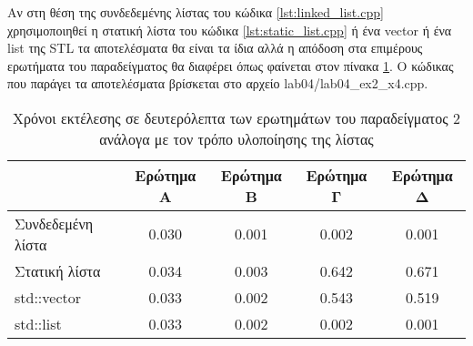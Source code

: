 



Αν στη θέση της συνδεδεμένης λίστας του κώδικα \ref{lst:linked_list.cpp} χρησιμοποιηθεί η στατική λίστα του κώδικα \ref{lst:static_list.cpp} ή ένα vector ή ένα list της STL τα αποτελέσματα θα είναι τα ίδια αλλά η απόδοση στα επιμέρους ερωτήματα του παραδείγματος θα διαφέρει όπως φαίνεται στον πίνακα \ref{tbl:lists}. Ο κώδικας που παράγει τα αποτελέσματα βρίσκεται στο αρχείο lab04/lab04\_ex2\_x4.cpp.

\begin{table}[!htb]
\centering
\begin{tabular}{|l|c|c|c|c|}
\hline
            & Ερώτημα A     & Ερώτημα B     & Ερώτημα Γ     & Ερώτημα Δ     \\ \hline
Συνδεδεμένη  λίστα & 0.030 & 0.001 & 0.002 & 0.001 \\ \hline
Στατική λίστα  & 0.034 & 0.003 & 0.642 & 0.671 \\ \hline
std::vector     & 0.033 & 0.002 & 0.543 & 0.519 \\ \hline
std::list      & 0.033 & 0.002 & 0.002 & 0.001 \\ \hline
\end{tabular}
\caption{Χρόνοι εκτέλεσης σε δευτερόλεπτα των ερωτημάτων του παραδείγματος 2 ανάλογα με τον τρόπο υλοποίησης της λίστας}
\label{tbl:lists}
\end{table}



